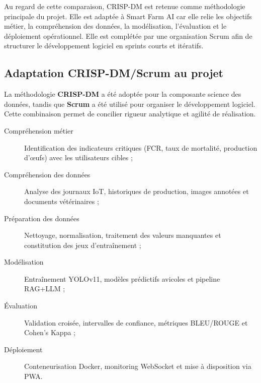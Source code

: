\begin{table}[H]
\centering
\caption{Avantages et inconvénients des méthodologies étudiées}
\label{tab:avantages_inconvenients_methodologies}
\renewcommand{\arraystretch}{1.2}
\end{table}

Au regard de cette comparaison, CRISP-DM est retenue comme méthodologie
principale du projet. Elle est adaptée à Smart Farm AI car elle relie les
objectifs métier, la compréhension des données, la modélisation, l'évaluation et
le déploiement opérationnel. Elle est complétée par une organisation Scrum afin
de structurer le développement logiciel en sprints courts et itératifs.

\subsection{Adaptation CRISP-DM/Scrum au projet}

La méthodologie \textbf{CRISP-DM} a été adoptée pour la composante science des
données, tandis que \textbf{Scrum} a été utilisé pour organiser le développement
logiciel. Cette combinaison permet de concilier rigueur analytique et agilité de
réalisation.

\begin{description}
  \item[Compréhension métier] Identification des indicateurs critiques
  (FCR, taux de mortalité, production d'œufs) avec les utilisateurs cibles ;
  \item[Compréhension des données] Analyse des journaux IoT, historiques de production,
  images annotées et documents vétérinaires ;
  \item[Préparation des données] Nettoyage, normalisation, traitement des valeurs
  manquantes et constitution des jeux d'entraînement ;
  \item[Modélisation] Entraînement YOLOv11, modèles prédictifs avicoles et pipeline RAG+LLM ;
  \item[Évaluation] Validation croisée, intervalles de confiance, métriques BLEU/ROUGE
  et Cohen's Kappa ;
  \item[Déploiement] Conteneurisation Docker, monitoring WebSocket et mise à disposition
  via PWA.
\end{description}

